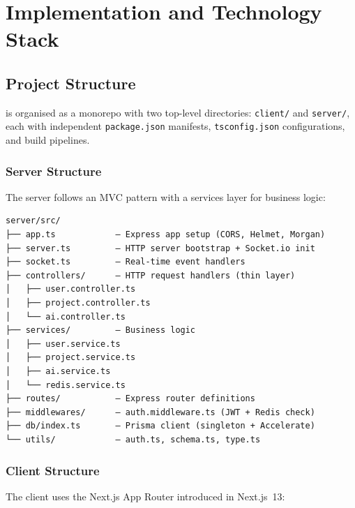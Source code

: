 \section{Implementation and Technology Stack}
\label{sec:implementation}

\subsection{Project Structure}

\echoray{} is organised as a monorepo with two top-level directories:
\texttt{client/} and \texttt{server/}, each with independent
\texttt{package.json} manifests, \texttt{tsconfig.json} configurations, and
build pipelines.

\subsubsection{Server Structure}

The server follows an MVC pattern with a services layer for business logic:

\begin{verbatim}
server/src/
├── app.ts            — Express app setup (CORS, Helmet, Morgan)
├── server.ts         — HTTP server bootstrap + Socket.io init
├── socket.ts         — Real-time event handlers
├── controllers/      — HTTP request handlers (thin layer)
│   ├── user.controller.ts
│   ├── project.controller.ts
│   └── ai.controller.ts
├── services/         — Business logic
│   ├── user.service.ts
│   ├── project.service.ts
│   ├── ai.service.ts
│   └── redis.service.ts
├── routes/           — Express router definitions
├── middlewares/      — auth.middleware.ts (JWT + Redis check)
├── db/index.ts       — Prisma client (singleton + Accelerate)
└── utils/            — auth.ts, schema.ts, type.ts
\end{verbatim}

\subsubsection{Client Structure}

The client uses the Next.js App Router introduced in Next.js~13:

